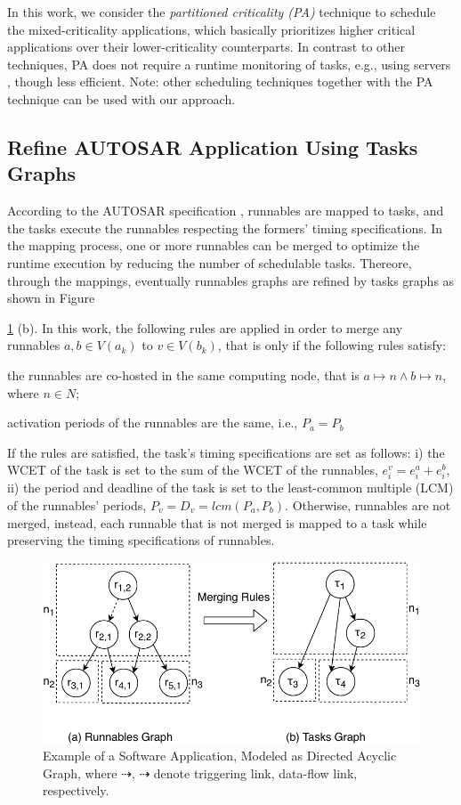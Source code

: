 In this work, we consider the \textit{partitioned criticality (PA)}  technique to schedule the mixed-criticality applications, which basically prioritizes higher critical applications over their lower-criticality counterparts. In contrast to other techniques, PA does not require a runtime monitoring of tasks, e.g., using servers \cite{AbeniIntegratingSystems,Ashjaei2017DesigningSystems,Inam2014ThePlatforms}, though less efficient. Note: other scheduling techniques together with the PA technique can be used with our approach.

\subsection{Refine AUTOSAR Application Using Tasks Graphs}\label{subsec_autosar_system}
According to the AUTOSAR specification \cite{AUTOSAR2017SpecificationSoftware}, runnables are mapped to tasks, and the tasks execute the runnables respecting the formers' timing specifications. In the mapping process, one or more runnables can be merged to optimize the runtime execution by reducing the number of schedulable tasks. Thereore, through the mappings, eventually runnables graphs are refined by tasks graphs as shown in Figure~{\ref{fig_appexample} (b). In this work, the following rules are applied in order to merge any runnables $a,b\in V(a_k)$ to $v\in V(b_k)$, that is only if the following rules satisfy:
\begin{enumerate*}[label=(\roman*)]
	\item the runnables are co-hosted in the same computing node, that is $a\mapsto n \land b\mapsto n$, where $n\in N$;
	\item activation periods of the runnables are the same, i.e., $P_a = P_b$
\end{enumerate*}
	
If the rules are satisfied, the task's timing specifications are set as follows: i) the WCET of the task is set to the sum of the WCET of the runnables, $e_i^v=e_i^a + e_i^b$, ii) the period and deadline of the task is set to the least-common multiple (LCM) of the runnables' periods, $P_v=D_v=lcm(P_a, P_b)$. Otherwise, runnables are not merged, instead, each runnable that is not merged is mapped to a task while preserving the timing specifications of runnables.
\begin{figure}[h!]
	\centering
	\includegraphics[width=0.7\linewidth]{img/runnable_task_dag}
	\caption[Example of a Software Application.]{Example of a Software Application, Modeled as Directed Acyclic Graph, where $\dashrightarrow$, $\dashrightarrow$ denote triggering link, data-flow link, respectively.}
	\label{fig_appexample}
\end{figure}

}
